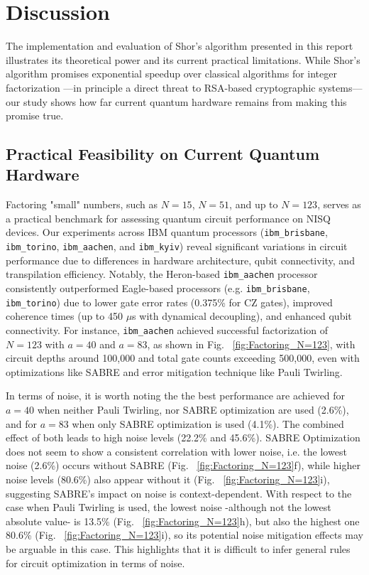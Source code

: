 \documentclass[conference,twoside]{IEEEtran}
\begin{document}
\section{Discussion}

The implementation and evaluation of Shor’s algorithm presented in this report illustrates its theoretical power and its current practical limitations. While Shor’s algorithm promises exponential speedup over classical algorithms for integer factorization —in principle a direct threat to RSA-based cryptographic systems— our study shows how far current quantum hardware remains from making this promise true.

\subsection{Practical Feasibility on Current Quantum Hardware}
Factoring "small" numbers, such as $N=15$, $N=51$, and up to $N=123$, serves as a practical benchmark for assessing quantum circuit performance on NISQ devices. Our experiments across IBM quantum processors (\texttt{ibm\_brisbane}, \texttt{ibm\_torino}, \texttt{ibm\_aachen}, and \texttt{ibm\_kyiv}) reveal significant variations in circuit performance due to differences in hardware architecture, qubit connectivity, and transpilation efficiency. Notably, the Heron-based \texttt{ibm\_aachen} processor consistently outperformed Eagle-based processors (e.g. \texttt{ibm\_brisbane}, \texttt{ibm\_torino}) due to lower gate error rates (0.375\% for CZ gates), improved coherence times (up to 450 $\mu$s with dynamical decoupling), and enhanced qubit connectivity. For instance, \texttt{ibm\_aachen} achieved successful factorization of $N=123$ with $a=40$ and $a=83$, as shown in Fig. ~\ref{fig:Factoring_N=123}, with circuit depths around 100,000 and total gate counts exceeding 500,000, even with optimizations like SABRE and error mitigation technique like Pauli Twirling. 

In terms of noise, it is worth noting the the best performance are achieved for $a=40$ when neither Pauli Twirling, nor SABRE optimization are used (2.6\%), and for $a=83$ when only SABRE optimization is used (4.1\%). The combined effect of both leads to high noise levels (22.2\% and 45.6\%). SABRE Optimization does not seem to show a consistent correlation with lower noise, i.e. the lowest noise (2.6\%) occurs without SABRE (Fig. ~\ref{fig:Factoring_N=123}f), while higher noise levels (80.6\%) also appear without it (Fig. ~\ref{fig:Factoring_N=123}i), suggesting SABRE's impact on noise is context-dependent. With respect to the case when Pauli Twirling is used, the lowest noise -although not the lowest absolute value- is 13.5\% (Fig. ~\ref{fig:Factoring_N=123}h), but also the highest one 80.6\% (Fig. ~\ref{fig:Factoring_N=123}i), so its potential noise mitigation effects may be arguable in this case. This highlights that it is difficult to infer general rules for circuit optimization in terms of noise.
\end{document}
